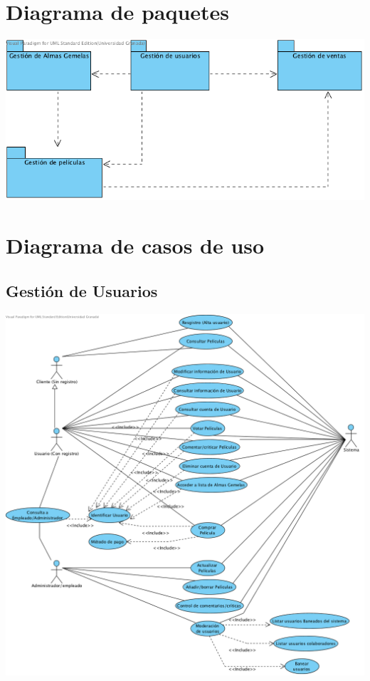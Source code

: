 \documentclass{article}
\begin{document}
\section{Diagrama de paquetes}
	\begin{center}
   		\includegraphics[scale=0.75]{Paquetes.png}
   	\end{center}

\section{Diagrama de casos de uso}
\subsection*{Gestión de Usuarios}
	\begin{center}
   		\includegraphics[scale=0.55]{GestiondeUsuarios.png}
   	\end{center}
\end{document}
